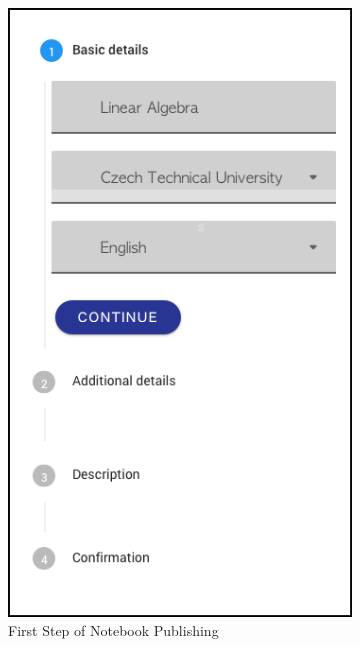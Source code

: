 \documentclass[thesis=B,english]{FITthesis}[2012/10/20]
\begin{document}
\begin{figure}
\centering
\begin{subfigure}{.5\textwidth}
  \centering
  \includegraphics[scale=0.4]{step1}
  \caption{First Step of Notebook Publishing}
  \label{fig:step1}
\end{subfigure}%
\begin{subfigure}{.5\textwidth}
  \centering

\end{subfigure}
\end{figure}
\end{document}
